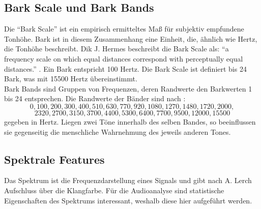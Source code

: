 \documentclass[11pt,a4paper]{article}
\begin{document}
\subsection{Bark Scale und Bark Bands}
Die ``Bark Scale'' ist ein empirisch ermitteltes Maß für subjektiv empfundene Tonhöhe. Bark ist in diesem Zusammenhang eine Einheit, die, ähnlich wie Hertz, die Tonhöhe beschreibt. Dik J. Hermes beschreibt die Bark Scale als: ``a frequency scale on which equal distances correspond with perceptually equal distances.'' \cite{BBands}. Ein Bark entspricht 100 Hertz. Die Bark Scale ist definiert bis 24 Bark, was mit 15500 Hertz übereinstimmt.\\
Bark Bands sind Gruppen von Frequenzen, deren Randwerte den Barkwerten 1 bis 24 entsprechen. Die Randwerte der Bänder sind nach \cite[S. 3]{smith1999bark}:
\[0, 100, 200, 300, 400, 510, 630, 770, 920, 1080, 1270, 1480, 1720, 2000, \]
\[2320, 2700, 3150, 3700, 4400, 5300, 6400, 7700, 9500, 12 000, 15 500\]
gegeben in Hertz. Liegen zwei Töne innerhalb des selben Bandes, so beeinflussen sie gegenseitig die menschliche Wahrnehmung des jeweils anderen Tones.

\subsection{Spektrale Features}
\label{sec:GrundlagenSpektraleFeatures}
Das Spektrum ist die Frequenzdarstellung eines Signals und gibt nach A. Lerch \cite[S. 41]{lerch2012introduction} Aufschluss über die Klangfarbe. Für die Audioanalyse sind statistische Eigenschaften des Spektrums interessant, weshalb diese hier aufgeführt werden.
\end{document}
